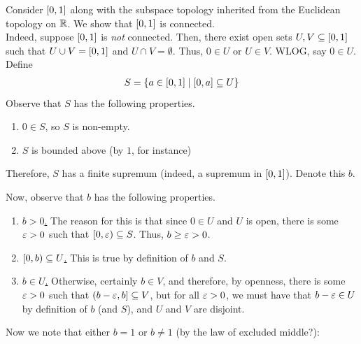 \begin{boxexample}
    Consider $\left[ 0, 1 \right]$ along with the subspace topology inherited from the Euclidean topology on $\mathbb{R}$. We show that $\left[ 0, 1 \right]$ is connected. \\
    
    Indeed, suppose $\left[ 0, 1 \right]$ is \textit{not} connected. Then, there exist open sets $U, V \subseteq \left[ 0, 1 \right]$ such that $U \cup V = \left[ 0, 1 \right]$ and $U \cap V = \emptyset$. Thus, $0 \in U$ or $U \in V$. WLOG, say $0 \in U$. Define
    \begin{align*}
        S = \left\{ a \in \left[ 0, 1 \right] \; \middle\vert \; \left[ 0, a \right] \subseteq U \right\}
    \end{align*}
    Observe that $S$ has the following properties.
    \begin{enumerate}
        \item $0 \in S$, so $S$ is non-empty.
        \item $S$ is bounded above (by $1$, for instance)
    \end{enumerate}
    Therefore, $S$ has a finite supremum (indeed, a supremum in $\left[ 0, 1 \right]$). Denote this $b$.
    \begin{figure}[H]
        \centering
    \end{figure}
    Now, observe that $b$ has the following properties.
    \begin{enumerate}
        \item \underline{$b > 0$.} The reason for this is that since $0 \in U$ and $U$ is open, there is some $\varepsilon > 0$ such that $\left[0, \varepsilon\right) \subseteq S$. Thus, $b \geq \varepsilon > 0$.

        \item \underline{$\left[0, b\right) \subseteq U$.} This is true by definition of $b$ and $S$.

        \item \underline{$b \in U$.} Otherwise, certainly $b \in V$, and therefore, by openness, there is some $\varepsilon > 0$ such that $\left(b - \varepsilon, b\right] \subseteq V$, but for all $\varepsilon > 0$, we must have that $b - \varepsilon \in U$ by definition of $b$ (and $S$), and $U$ and $V$ are disjoint.
    \end{enumerate}
    Now we note that either $b=1$ or $b\neq 1$ (by the law of excluded middle?): 
    

\end{boxexample}
